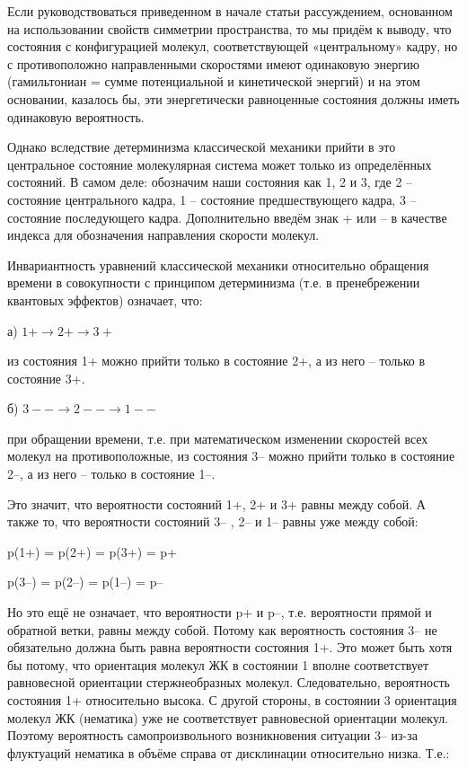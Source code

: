 \documentclass[11pt]{article}
\begin{document}
Если руководствоваться приведенном в начале статьи рассуждением,
основанном на использовании свойств симметрии пространства, то мы придём
к выводу, что состояния с конфигурацией молекул, соответствующей
«центральному» кадру, но с противоположно направленными скоростями имеют
одинаковую энергию (гамильтониан = сумме потенциальной и кинетической
энергий) и на этом основании, казалось бы, эти энергетически равноценные
состояния должны иметь одинаковую вероятность.

Однако вследствие детерминизма классической механики прийти в это
центральное состояние молекулярная система может только из определённых
состояний. В самом деле: обозначим наши состояния как 1, 2 и 3, где 2 --
состояние центрального кадра, 1 -- состояние предшествующего кадра, 3 --
состояние последующего кадра. Дополнительно введём знак + или -- в
качестве индекса для обозначения направления скорости молекул.

Инвариантность уравнений классической механики относительно обращения
времени в совокупности с принципом детерминизма (т.е. в пренебрежении
квантовых эффектов) означает, что:

а) $1+ \rightarrow 2+ \rightarrow 3+$

из состояния 1+ можно прийти только в состояние 2+, а из него -- только
в состояние 3+.

б) $3-- \rightarrow 2-- \rightarrow 1--$

при обращении времени, т.е. при математическом изменении скоростей всех
молекул на противоположные, из состояния 3-- можно прийти только в
состояние 2--, а из него -- только в состояние 1--.

Это значит, что вероятности состояний 1+, 2+ и 3+ равны между собой. А
также то, что вероятности состояний 3-- , 2-- и 1-- равны уже между
собой:

p(1+) = p(2+) = p(3+) = p+

p(3--) = p(2--) = p(1--) = p--

Но это ещё не означает, что вероятности p+ и p--, т.е. вероятности
прямой и обратной ветки, равны между собой. Потому как вероятность
состояния 3-- не обязательно должна быть равна вероятности состояния 1+.
Это может быть хотя бы потому, что ориентация молекул ЖК в состоянии 1
вполне соответствует равновесной ориентации стержнеобразных молекул.
Следовательно, вероятность состояния 1+ относительно высока. С другой
стороны, в состоянии 3 ориентация молекул ЖК (нематика) уже не
соответствует равновесной ориентации молекул. Поэтому вероятность
самопроизвольного возникновения ситуации 3-- из-за флуктуаций нематика в
объёме справа от дисклинации относительно низка. Т.е.:
\end{document}
